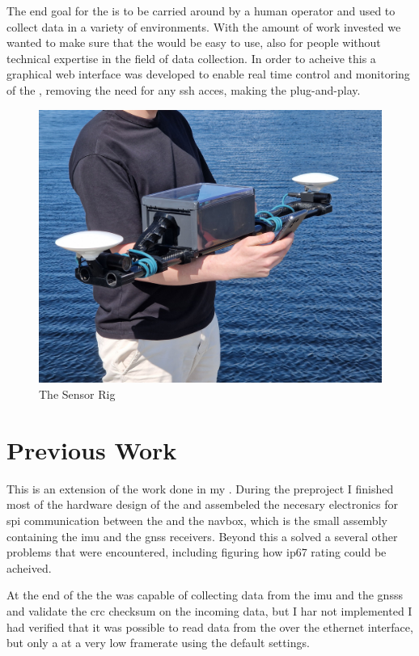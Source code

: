 The end goal for the \sr is to be carried around by a human operator and used to collect data in a variety of environments.
With the amount of work invested we wanted to make sure that the \sr would be easy to use, also for people without technical expertise in the field of data collection.
In order to acheive this a graphical web interface was developed to enable real time control and monitoring of the \sr, removing the need for any ssh acces, making the \sr plug-and-play.

\todo
\begin{figure}[H]
    \includegraphics[width=\textwidth]{figures/frontpage.jpg}
    \caption{The Sensor Rig}
\end{figure}

\section{Previous Work}
This \master is an extension of the work done in my \preproject \cite{martensPortableSensorRig2022}.
During the preproject I finished most of the hardware design of the \sr
and assembeled the necesary electronics for \gls{spi} communication between the \jx and the \gls{navbox}, which is the small assembly containing the \gls{imu} and the \gls{gnss} receivers.
Beyond this a solved a several other problems that were encountered, including figuring how \gls{ip67} rating could be acheived.

At the end of the \preproject the \sr was capable of collecting data from the \gls{imu} and the \glspl{gnss} and validate the \gls{crc} checksum on the incoming data, but I har not implemented
I had verified that it was possible to read data from the \cams over the ethernet interface, but only a at a very low framerate using the default settings.

